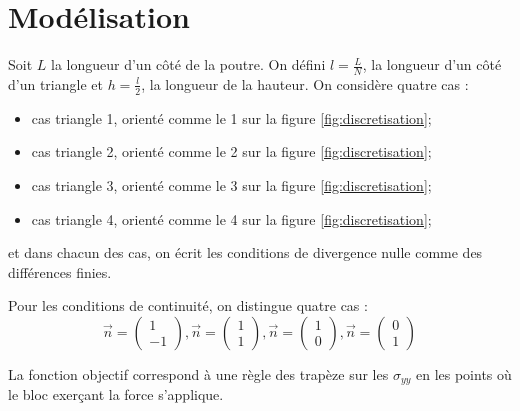 \newpage
\section{Modélisation}
Soit $L$ la longueur d'un côté de la poutre. On défini $l=\frac{L}{N}$, la longueur d'un côté d'un triangle et $h=\frac{l}{2}$, la longueur de la hauteur. On considère quatre cas : 
\begin{itemize}
\item cas triangle 1, orienté comme le 1 sur la figure \ref{fig:discretisation};
\item cas triangle 2, orienté comme le 2 sur la figure \ref{fig:discretisation};
\item cas triangle 3, orienté comme le 3 sur la figure \ref{fig:discretisation};
\item cas triangle 4, orienté comme le 4 sur la figure \ref{fig:discretisation};
\end{itemize} 
et dans chacun des cas, on écrit les conditions de divergence nulle comme des différences finies. 


Pour les conditions de continuité, on distingue quatre cas : 
\begin{equation}
\overrightarrow{n} = \begin{pmatrix}
1\\
-1
\end{pmatrix}, 
\overrightarrow{n} = \begin{pmatrix}
1\\
1
\end{pmatrix}, 
\overrightarrow{n} = \begin{pmatrix}
1\\
0
\end{pmatrix},
\overrightarrow{n} = \begin{pmatrix}
0\\
1
\end{pmatrix}
\end{equation}

La fonction objectif correspond à une règle des trapèze sur les $\sigma_{yy}$ en les points où le bloc exerçant la force s'applique. 

